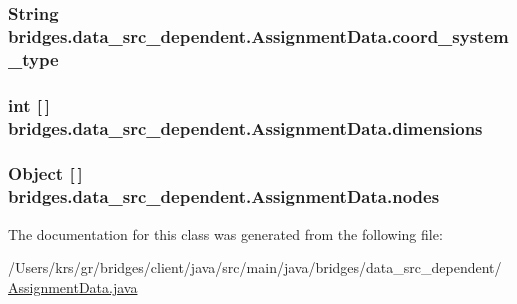 \subsubsection[{coord\+\_\+system\+\_\+type}]{\setlength{\rightskip}{0pt plus 5cm}String bridges.\+data\+\_\+src\+\_\+dependent.\+Assignment\+Data.\+coord\+\_\+system\+\_\+type}\label{classbridges_1_1data__src__dependent_1_1_assignment_data_a6734aba0f017aca0024fcd80905be4f4}
\hypertarget{classbridges_1_1data__src__dependent_1_1_assignment_data_ab4aa179a24395748542f6fb64307132c}{}
\subsubsection[{dimensions}]{\setlength{\rightskip}{0pt plus 5cm}int \mbox{[}$\,$\mbox{]} bridges.\+data\+\_\+src\+\_\+dependent.\+Assignment\+Data.\+dimensions}\label{classbridges_1_1data__src__dependent_1_1_assignment_data_ab4aa179a24395748542f6fb64307132c}
\hypertarget{classbridges_1_1data__src__dependent_1_1_assignment_data_a1d7c23816a57cf9b3bd1bc0b53f15e8e}{}
\subsubsection[{nodes}]{\setlength{\rightskip}{0pt plus 5cm}Object \mbox{[}$\,$\mbox{]} bridges.\+data\+\_\+src\+\_\+dependent.\+Assignment\+Data.\+nodes}\label{classbridges_1_1data__src__dependent_1_1_assignment_data_a1d7c23816a57cf9b3bd1bc0b53f15e8e}


The documentation for this class was generated from the following file\+:\begin{DoxyCompactItemize}
\item 
/\+Users/krs/gr/bridges/client/java/src/main/java/bridges/data\+\_\+src\+\_\+dependent/\hyperlink{_assignment_data_8java}{Assignment\+Data.\+java}\end{DoxyCompactItemize}
